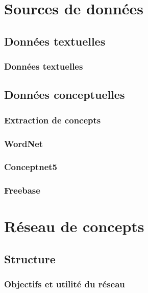 \documentclass[12pt]{beamer}
\begin{document}

\section{Sources de données}

\subsection{Données textuelles}

\begin{frame}
 \frametitle{Données textuelles}
 
 
\end{frame}

\subsection{Données conceptuelles}

\begin{frame}
 \frametitle{Extraction de concepts}
 
 
\end{frame}

\begin{frame}
 \frametitle{WordNet}
 
 
\end{frame}

\begin{frame}
 \frametitle{Conceptnet5}
 
 
\end{frame}

\begin{frame}
 \frametitle{Freebase}
 
 
\end{frame}



\section{Réseau de concepts}

\subsection{Structure}

\begin{frame}
 \frametitle{Objectifs et utilité du réseau}
 
 
\end{frame}
\end{document}
